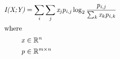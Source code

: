 \documentclass[12pt]{article}
\begin{document}
\begin{center}
\resizebox{\textwidth}{!} 
{
\begin{minipage}[c]{\textwidth}
\begin{align*}
\textit{I(X;Y)} & = \sum_\mathit{i} \sum_\mathit{j} \mathit{x}_{ \mathit{j} }\mathit{p}_{\mathit{i}, \mathit{j}} \log_2{ \frac{\mathit{p}_{\mathit{i}, \mathit{j}}}{\sum_\mathit{k} \mathit{x}_{ \mathit{k} }\mathit{p}_{\mathit{i}, \mathit{k}}} } \\
\intertext{where} 
\mathit{x} & \in \mathbb{R}^{ \mathit{n}} \\
\mathit{p} & \in \mathbb{R}^{ \mathit{m} \times \mathit{n} } \\
\\
\end{align*}
\end{minipage}
}
\end{center}
\end{document}
